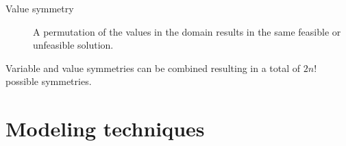 \begin{description}
\begin{description}
            \item[Value symmetry] 
                A permutation of the values in the domain results in the same feasible or unfeasible solution.
        \end{description}

        \begin{remark}
            Variable and value symmetries can be combined resulting in a total of $2n!$ possible symmetries.
        \end{remark}
\end{description}



\section{Modeling techniques}

